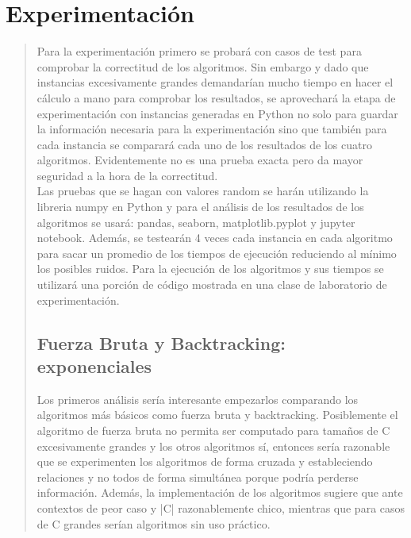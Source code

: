 \documentclass[8pt,a4paper]{article}
\begin{document}
\section{Experimentación}
\begin{verse}
Para la experimentación primero se probará con casos de test para comprobar la correctitud de los algoritmos. Sin embargo y dado que instancias excesivamente grandes demandarían mucho tiempo en hacer el cálculo a mano para comprobar los resultados, se aprovechará la etapa de experimentación con instancias generadas en Python no solo para guardar la información necesaria para la experimentación  sino que también para cada instancia se comparará cada uno de los resultados de los cuatro algoritmos. Evidentemente no es una prueba exacta pero da mayor seguridad a la hora de la correctitud.\\
Las pruebas que se hagan con valores random se harán utilizando la libreria numpy en Python y para el análisis de los resultados de los algoritmos se usará: pandas, seaborn, matplotlib.pyplot y jupyter notebook. Además, se testearán 4 veces cada instancia en cada algoritmo para sacar un promedio de los tiempos de ejecución reduciendo al mínimo los posibles ruidos. Para la ejecución de los algoritmos y sus tiempos se utilizará una porción de código mostrada en una clase de laboratorio de experimentación.
\\
\subsection{Fuerza Bruta y Backtracking: exponenciales}

Los primeros análisis sería interesante empezarlos comparando los algoritmos más básicos como fuerza bruta y backtracking. Posiblemente el algoritmo de fuerza bruta no permita ser computado para tamaños de C excesivamente grandes y los otros algoritmos sí, entonces sería razonable que se experimenten los algoritmos de forma cruzada y estableciendo relaciones y no todos de forma simultánea porque podría perderse información.
Además, la implementación de los algoritmos sugiere que ante contextos de peor caso y |C| razonablemente chico, mientras que para casos de C grandes serían algoritmos sin uso práctico.
\\


\end{verse}
\end{document}
